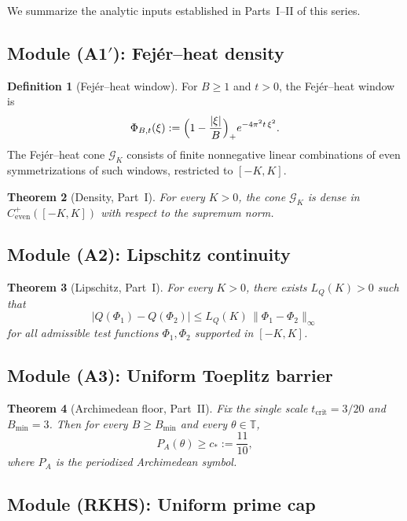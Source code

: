 \documentclass[11pt,a4paper]{article}
\newtheorem{theorem}{Theorem}[section]
\theoremstyle{definition}
\newtheorem{definition}[theorem]{Definition}
\newcommand{\TT}{\mathbb{T}}
\newcommand{\GG}{\mathcal{G}}
\begin{document}
We summarize the analytic inputs established in Parts~I--II of this series.

\subsection{Module (A1$'$): Fej\'er--heat density}

\begin{definition}[Fej\'er--heat window]
For $B \ge 1$ and $t > 0$, the Fej\'er--heat window is
\[
\Phi_{B,t}(\xi) := \Bigl(1 - \frac{|\xi|}{B}\Bigr)_+ e^{-4\pi^2 t\,\xi^2}.
\]
The Fej\'er--heat cone $\GG_K$ consists of finite nonnegative linear combinations of even symmetrizations of such windows, restricted to $[-K,K]$.
\end{definition}

\begin{theorem}[Density, Part~I]\label{thm:density}
For every $K > 0$, the cone $\GG_K$ is dense in $C^+_{\mathrm{even}}([-K,K])$ with respect to the supremum norm.
\end{theorem}

\subsection{Module (A2): Lipschitz continuity}

\begin{theorem}[Lipschitz, Part~I]\label{thm:lipschitz}
For every $K > 0$, there exists $L_Q(K) > 0$ such that
\[
|Q(\Phi_1) - Q(\Phi_2)| \le L_Q(K)\,\|\Phi_1 - \Phi_2\|_\infty
\]
for all admissible test functions $\Phi_1, \Phi_2$ supported in $[-K,K]$.
\end{theorem}

\subsection{Module (A3): Uniform Toeplitz barrier}

\begin{theorem}[Archimedean floor, Part~II]\label{thm:floor}
Fix the single scale $t_{\mathrm{crit}} = 3/20$ and $B_{\min} = 3$. Then for every $B \ge B_{\min}$ and every $\theta \in \TT$,
\[
P_A(\theta) \ge c_* := \frac{11}{10},
\]
where $P_A$ is the periodized Archimedean symbol.
\end{theorem}

\subsection{Module (RKHS): Uniform prime cap}
\end{document}

